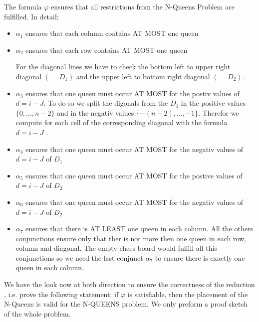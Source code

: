 \documentclass [11pt]{article}
\renewcommand{\phi}{\varphi}
\begin{document}
The formula $\phi$ ensures that all restrictions from the N-Queens Problem are fulfilled. In detail:
 \begin{itemize}
\item  $ \alpha_1 $ ensures that each column contains AT MOST one queen
\item  $ \alpha_2 $ ensures that each row contains AT MOST one queen

\smallskip For the diagonal lines we have to check the bottom left to upper right diagonal $(= D_1)$ and the upper left to bottom right diagonal $(=D_2)$.
\item  $ \alpha_3 $ ensures that one queen must occur AT MOST for the postiv values of $d=i-J$. To do so we split the digonals from the $D_1$ in the positive values $\{0, ... , n-2\}$ and in the negativ values $\{-(n-2),..., -1\}$. Therefor we compute for each cell of the corresponding diagonal with the formula $d=i-J$ .
\item  $ \alpha_4 $ ensures that one queen must occur AT MOST for the negativ values of $d=i-J$ of $D_1$
\item  $ \alpha_5 $ ensures that one queen must occur AT MOST for the postive values of $d=i-J$ of $D_2$
\item  $ \alpha_6 $ ensures that one queen must occur AT MOST for the negativ values of $d=i-J$ of $D_2$
\item  $ \alpha_7 $ ensures that there is AT LEAST one queen in each column. All the others conjunctions ensure only that ther is not more then one queen in each row, column and diagonal. The empty chees board would fulfill all this conjunctions so we need the last conjunct   $ \alpha_7 $ to ensure there is exactly one queen in each column.

 \end{itemize}

\bigskip
 We have the look now at  both direction to ensure the correctness of the reduction ,
i.e. prove the following statement: if $\phi$ is satisfiable, then the placement of the N-Queens is valid for the N-QUEENS problem. We only preform a proof sketch of the whole problem.
\end{document}
